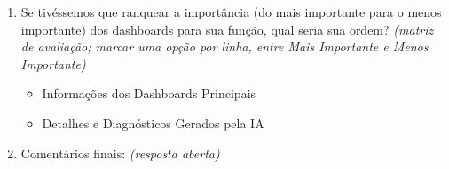 \begin{enumerate}
\begin{itemize}
        \item São fundamentais para o planejamento estratégico da minha área
        \item Oferecem uma visão clara do progresso de Mossoró nos Objetivos de Desenvolvimento Sustentável (ODS)
        \item São muito superficiais e pouco acionáveis
        \item Não utilizo os diagnósticos
    \end{itemize}
    \item Se tivéssemos que ranquear a importância (do mais importante para o menos importante) dos dashboards para sua função, qual seria sua ordem? \textit{(matriz de avaliação; marcar uma opção por linha, entre Mais Importante e Menos Importante)}
    \begin{itemize}
        \item Informações dos Dashboards Principais
        \item Detalhes e Diagnósticos Gerados pela IA
    \end{itemize}
    \item Comentários finais: \textit{(resposta aberta)}
\end{enumerate}

